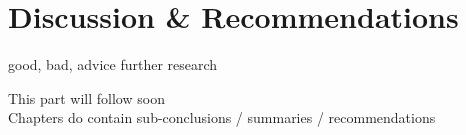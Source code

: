 \chapter{Discussion \& Recommendations}

good, bad, advice further research

This part will follow soon \\
Chapters do contain sub-conclusions / summaries / recommendations \\
